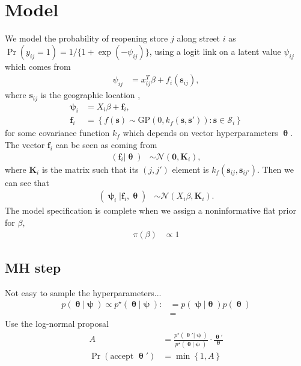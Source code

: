 \documentclass[11pt]{article}
\newcommand{\pN}{\mathcal{N}}
\newcommand{\1}{\mathbf{1}}
\newcommand{\0}{\mathbf{0}}
\newcommand{\f}{\mathbf{f}}
\newcommand{\K}{\mathbf{K}}
\newcommand{\bmpsi}{\bm{\uppsi}}
\begin{document}

\section{Model}\label{Model}

We model the probability of reopening store $j$ along street $i$ as $\Pr(y_{ij} = 1) = 1/\{ 1 + \exp(-\psi_{ij}) \}$, using a logit link on a latent value $\psi_{ij}$ which comes from 
%
%
%
\begin{align*}
	\psi_{ij} &= x_{ij}^T\beta + f_i(\mathbf{s}_{ij}),
\end{align*}
%
%
where $\mathbf{s}_{ij}$ is the geographic location ,
%
%
%
\begin{align*}
	\bmpsi_{i} &= X_i\beta + \f_i, \\
	\f_i &= \left\{ f(\mathbf{s}) \sim \text{GP}(0, k_f(\mathbf{s},\mathbf{s}')) : \mathbf{s} \in \mathcal{S}_i \right\}
\end{align*}
%
%
%
for some covariance function $k_f$ which depends on vector hyperparameters $\bm{\uptheta}$. The vector $\f_i$ can be seen as coming from 
%
%
\begin{align*}
	(\f_i | \bm{\uptheta}) &\sim \pN(\mathbf{0}, \K_{i}),
\end{align*}
%
%
%
where $\K_{i}$ is the matrix such that its $(j, j')$ element is $k_f(\mathbf{s}_{ij}, \mathbf{s}_{ij'})$. Then we can see that
%
%
%
\begin{align*}
	(\bmpsi_i | \f_i, \bm{\uptheta}) &\sim \pN(X_i\beta, \K_i).
\end{align*}
%
%
%
The model specification is complete when we assign a noninformative flat prior for $\beta,$ 
%
%
\begin{align*}
	\pi(\beta) &\propto 1
\end{align*} 

\subsection{MH step}

Not easy to sample the hyperparameters...
%
%
%
\begin{align*}
	p(\bm{\uptheta} | \bmpsi) \propto p^\star(\bm{\uptheta} | \bmpsi) :&= p(\bmpsi | \bm{\uptheta}) p(\bm{\uptheta}) \\
	&= 
\end{align*}
%
%
%
Use the log-normal proposal
%
%
%
\begin{align}
	A &= \frac{p^\star(\bm{\uptheta}' | \bmpsi)}{p^\star(\bm{\uptheta} | \bmpsi)} \cdot \frac{\bm{\uptheta}'}{\bm{\uptheta}} \\
	\Pr(\text{accept }\bm{\uptheta}') &= \min \left\{ 1, A \right\}
\end{align}
\end{document}
